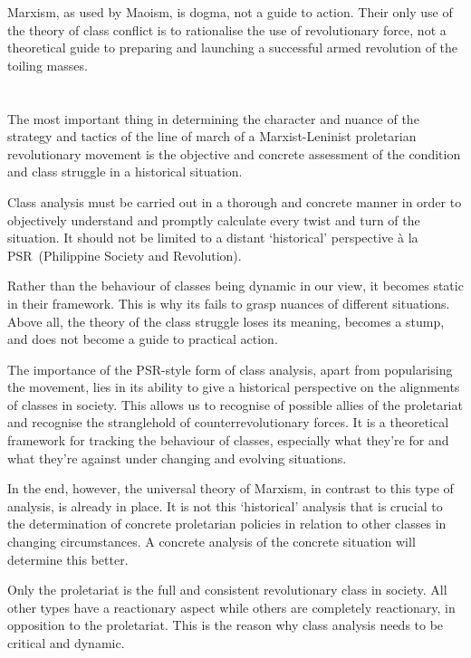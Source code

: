 Marxism, as used by Maoism, is dogma, not a guide to action. 
Their only use of the theory of class conflict is to rationalise 
the use of revolutionary force, 
not a theoretical guide to preparing 
and launching a successful armed revolution of the toiling masses.

\section{}
The most important thing in determining the character and nuance 
of the strategy and tactics of the line of march of 
a Marxist-Leninist proletarian revolutionary movement 
is the objective and concrete assessment 
of the condition and class struggle in a historical situation.

Class analysis must be carried out in 
a thorough and concrete manner in order to 
objectively understand and promptly calculate 
every twist and turn of the situation. 
It should not be limited to a distant `historical' perspective 
à la PSR~(Philippine Society and Revolution).

Rather than the behaviour of classes being dynamic in our view, 
it becomes static in their framework. 
This is why its fails to grasp 
nuances of different situations.
Above all, 
the theory of the class struggle 
loses its meaning,
becomes a stump, 
and does not become a guide to practical action.

The importance of the PSR-style form of class analysis, 
apart from popularising the movement, 
lies in its ability to give a 
historical perspective on the alignments of classes in society. 
This allows us to recognise of possible allies of the proletariat 
and recognise the stranglehold of counterrevolutionary forces. 
It is a theoretical framework 
for tracking the behaviour of classes, 
especially what they're for and what they're against 
under changing and evolving situations.

In the end, however, 
the universal theory of Marxism,
in contrast to this type of analysis, 
is already in place. 
It is not this `historical' analysis that is crucial 
to the determination of concrete proletarian policies 
in relation to other classes in changing circumstances. 
A concrete analysis of the concrete situation will determine this better.

Only the proletariat 
is the full and consistent revolutionary class in society. 
All other types have a reactionary aspect 
while others are completely reactionary,
in opposition to the proletariat. 
This is the reason why class analysis needs to be critical and dynamic.

